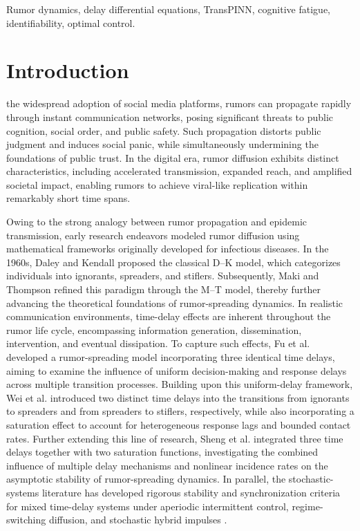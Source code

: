 \documentclass[letterpaper,journal]{IEEEtran}
\begin{document}
	\begin{IEEEkeywords}
		Rumor dynamics, delay differential equations, TransPINN, cognitive fatigue, identifiability, optimal control.
	\end{IEEEkeywords}
	
	\section{Introduction}
	 the widespread adoption of social media platforms, rumors can propagate rapidly through instant communication networks, posing significant threats to public cognition\cite{shen2024cognitive}, social order\cite{xia2007emergence}, and public safety\cite{knapp1944psychology,lv2022new,dong2025rumor,mou2022social,li2024information,xiao2022diffusion,zhong2023rumor,jiang2022rumor}. Such propagation distorts public judgment and induces social panic, while simultaneously undermining the foundations of public trust. In the digital era, rumor diffusion exhibits distinct characteristics, including accelerated transmission, expanded reach, and amplified societal impact, enabling rumors to achieve viral-like replication within remarkably short time spans.
	
	Owing to the strong analogy between rumor propagation and epidemic transmission, early research endeavors modeled rumor diffusion using mathematical frameworks originally developed for infectious diseases. In the 1960s, Daley and Kendall \cite{daley1964epidemics} proposed the classical D–K model, which categorizes individuals into ignorants, spreaders, and stiflers. Subsequently, Maki and Thompson \cite{maki1973mathematical,gani2000maki} refined this paradigm through the M–T model, thereby further advancing the theoretical foundations of rumor-spreading dynamics.
	In realistic communication environments, time-delay effects are inherent throughout the rumor life cycle, encompassing information generation, dissemination, intervention, and eventual dissipation. To capture such effects, Fu et al.\cite{fu2025rumor} developed a rumor-spreading model incorporating three identical time delays, aiming to examine the influence of uniform decision-making and response delays across multiple transition processes. Building upon this uniform-delay framework, Wei et al. \cite{wei2025stability} introduced two distinct time delays into the transitions from ignorants to spreaders and from spreaders to stiflers, respectively, while also incorporating a saturation effect to account for heterogeneous response lags and bounded contact rates. Further extending this line of research, Sheng et al.\cite{sheng2025asymptotic} integrated three time delays together with two saturation functions, investigating the combined influence of multiple delay mechanisms and nonlinear incidence rates on the asymptotic stability of rumor-spreading dynamics.
	In parallel, the stochastic-systems literature has developed rigorous stability and synchronization criteria for mixed time-delay systems under aperiodic intermittent control, regime-switching diffusion, and stochastic hybrid impulses \cite{zhang2025semiglobal,zhang2025exponential,zhang2022stability}.
	
\end{document}
